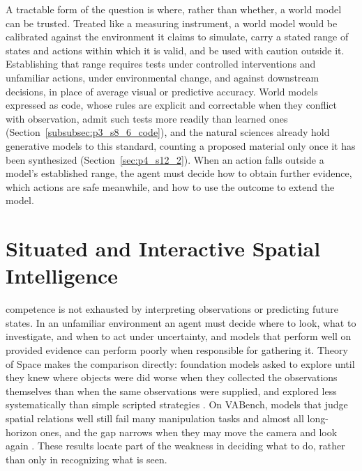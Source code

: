 A tractable form of the question is where, rather than whether, a world model can be trusted.
Treated like a measuring instrument, a world model would be calibrated against the environment it claims to simulate, carry a stated range of states and actions within which it is valid, and be used with caution outside it.
Establishing that range requires tests under controlled interventions and unfamiliar actions, under environmental change, and against downstream decisions, in place of average visual or predictive accuracy.
World models expressed as code, whose rules are explicit and correctable when they conflict with observation, admit such tests more readily than learned ones (Section~\ref{subsubsec:p3_s8_6_code}), and the natural sciences already hold generative models to this standard, counting a proposed material only once it has been synthesized (Section~\ref{sec:p4_s12_2}).
When an action falls outside a model's established range, the agent must decide how to obtain further evidence, which actions are safe meanwhile, and how to use the outcome to extend the model.


\section{Situated and Interactive Spatial Intelligence}
\label{sec:p5_agency}
\label{sec:p5_competence}
\label{sec:p5_people}

 competence is not exhausted by interpreting observations or predicting future states.
In an unfamiliar environment an agent must decide where to look, what to investigate, and when to act under uncertainty, and models that perform well on provided evidence can perform poorly when responsible for gathering it.
Theory of Space makes the comparison directly: foundation models asked to explore until they knew where objects were did worse when they collected the observations themselves than when the same observations were supplied, and explored less systematically than simple scripted strategies \cite{zhang2026theory}.
On VABench, models that judge spatial relations well still fail many manipulation tasks and almost all long-horizon ones, and the gap narrows when they may move the camera and look again \cite{zhang2026vabench}.
These results locate part of the weakness in deciding what to do, rather than only in recognizing what is seen.

